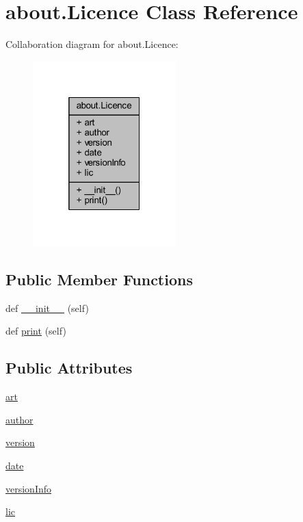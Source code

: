 \hypertarget{classabout_1_1_licence}{}\section{about.\+Licence Class Reference}
\label{classabout_1_1_licence}


Collaboration diagram for about.\+Licence\+:\nopagebreak
\begin{figure}[H]
\begin{center}
\leavevmode
\includegraphics[width=157pt]{classabout_1_1_licence__coll__graph}
\end{center}
\end{figure}
\subsection*{Public Member Functions}
\begin{DoxyCompactItemize}
\item 
def \mbox{\hyperlink{classabout_1_1_licence_a6c11624281f8710f2c1eb90c33285714}{\+\_\+\+\_\+init\+\_\+\+\_\+}} (self)
\item 
def \mbox{\hyperlink{classabout_1_1_licence_a9e1e0f8b2a9fb1c4c34f0fac0cfd2b94}{print}} (self)
\end{DoxyCompactItemize}
\subsection*{Public Attributes}
\begin{DoxyCompactItemize}
\item 
\mbox{\hyperlink{classabout_1_1_licence_a86ed9b8474a45be978024c106a690919}{art}}
\item 
\mbox{\hyperlink{classabout_1_1_licence_ac292e3400b704815fe91a2761f3ab2c1}{author}}
\item 
\mbox{\hyperlink{classabout_1_1_licence_a54d0ec766d3b53ff919f5e7349fe27c1}{version}}
\item 
\mbox{\hyperlink{classabout_1_1_licence_a84e5350951df766d2e12760ac1016fcf}{date}}
\item 
\mbox{\hyperlink{classabout_1_1_licence_a1591338bb07744db00318cfb2279257b}{version\+Info}}
\item 
\mbox{\hyperlink{classabout_1_1_licence_a4b8863c697fe25a9fec148269f98f10f}{lic}}
\end{DoxyCompactItemize}


